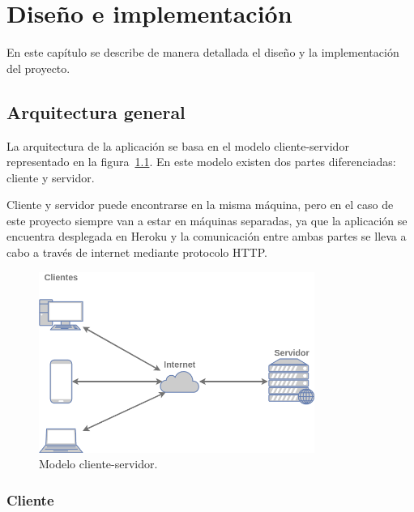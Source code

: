 \documentclass[a4paper, 12pt]{book}
\begin{document}

\cleardoublepage
\chapter{Diseño e implementación}
\label{chap:diseno}

En este capítulo se describe de manera detallada el diseño y la implementación del proyecto.

\section{Arquitectura general} 
\label{sec:arquitectura}

La arquitectura de la aplicación se basa en el modelo cliente-servidor representado en la figura~\ref{fig:cliente-servidor}.
En este modelo existen dos partes diferenciadas: cliente y servidor.

Cliente y servidor puede encontrarse en la misma máquina, pero en el caso de este proyecto siempre van a estar en máquinas separadas, ya que la aplicación se encuentra desplegada en Heroku y la comunicación entre ambas partes se lleva a cabo a través de internet mediante protocolo HTTP.

\begin{figure}
  \centering
  \includegraphics[width=9cm, keepaspectratio]{img/cliente-servidor.png}
  \caption{Modelo cliente-servidor.}\label{fig:cliente-servidor}
\end{figure}

\subsection{Cliente}
\label{subsec:arq_cliente}
\end{document}
